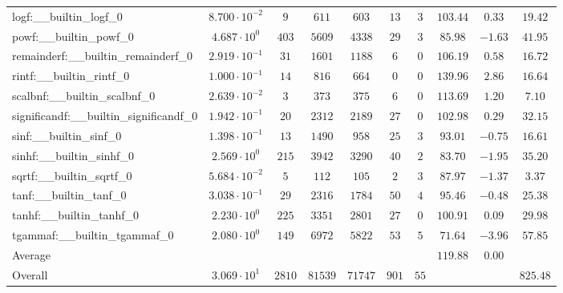 \begin{tabular}{|l|c|c|c|c|c|c|c|c|c|}
logf:\_\_builtin\_logf\_0                 & $ 8.700 \cdot 10^{-2} $ & $ 9      $ & $ 611   $ & $ 603   $ & $ 13  $ & $ 3  $ & $ 103.44      $ & $ 0.33    $ & $ 19.42   $ \\
powf:\_\_builtin\_powf\_0                 & $ 4.687 \cdot 10^{0}  $ & $ 403    $ & $ 5609  $ & $ 4338  $ & $ 29  $ & $ 3  $ & $ 85.98       $ & $ -1.63   $ & $ 41.95   $ \\
remainderf:\_\_builtin\_remainderf\_0     & $ 2.919 \cdot 10^{-1} $ & $ 31     $ & $ 1601  $ & $ 1188  $ & $ 6   $ & $ 0  $ & $ 106.19      $ & $ 0.58    $ & $ 16.72   $ \\
rintf:\_\_builtin\_rintf\_0               & $ 1.000 \cdot 10^{-1} $ & $ 14     $ & $ 816   $ & $ 664   $ & $ 0   $ & $ 0  $ & $ 139.96      $ & $ 2.86    $ & $ 16.64   $ \\
scalbnf:\_\_builtin\_scalbnf\_0           & $ 2.639 \cdot 10^{-2} $ & $ 3      $ & $ 373   $ & $ 375   $ & $ 6   $ & $ 0  $ & $ 113.69      $ & $ 1.20    $ & $ 7.10    $ \\
significandf:\_\_builtin\_significandf\_0 & $ 1.942 \cdot 10^{-1} $ & $ 20     $ & $ 2312  $ & $ 2189  $ & $ 27  $ & $ 0  $ & $ 102.98      $ & $ 0.29    $ & $ 32.15   $ \\
sinf:\_\_builtin\_sinf\_0                 & $ 1.398 \cdot 10^{-1} $ & $ 13     $ & $ 1490  $ & $ 958   $ & $ 25  $ & $ 3  $ & $ 93.01       $ & $ -0.75   $ & $ 16.61   $ \\
sinhf:\_\_builtin\_sinhf\_0               & $ 2.569 \cdot 10^{0}  $ & $ 215    $ & $ 3942  $ & $ 3290  $ & $ 40  $ & $ 2  $ & $ 83.70       $ & $ -1.95   $ & $ 35.20   $ \\
sqrtf:\_\_builtin\_sqrtf\_0               & $ 5.684 \cdot 10^{-2} $ & $ 5      $ & $ 112   $ & $ 105   $ & $ 2   $ & $ 3  $ & $ 87.97       $ & $ -1.37   $ & $ 3.37    $ \\
tanf:\_\_builtin\_tanf\_0                 & $ 3.038 \cdot 10^{-1} $ & $ 29     $ & $ 2316  $ & $ 1784  $ & $ 50  $ & $ 4  $ & $ 95.46       $ & $ -0.48   $ & $ 25.38   $ \\
tanhf:\_\_builtin\_tanhf\_0               & $ 2.230 \cdot 10^{0}  $ & $ 225    $ & $ 3351  $ & $ 2801  $ & $ 27  $ & $ 0  $ & $ 100.91      $ & $ 0.09    $ & $ 29.98   $ \\
tgammaf:\_\_builtin\_tgammaf\_0           & $ 2.080 \cdot 10^{0}  $ & $ 149    $ & $ 6972  $ & $ 5822  $ & $ 53  $ & $ 5  $ & $ 71.64       $ & $ -3.96   $ & $ 57.85   $ \\
\hline
Average                                   & $                     $ & $        $ & $       $ & $       $ & $     $ & $    $ & $ 119.88      $ & $ 0.00    $ & $         $ \\
\hline
Overall                                   & $ 3.069 \cdot 10^{1}  $ & $ 2810   $ & $ 81539 $ & $ 71747 $ & $ 901 $ & $ 55 $ & $             $ & $         $ & $ 825.48  $ \\
\hline
\end{tabular}
